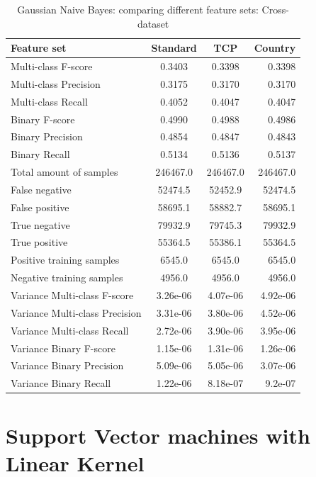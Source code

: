 \begin{table}[H]
\caption{Gaussian Naive Bayes: comparing different feature sets: Cross-dataset}
\label{tab:bay:cross}
\centering
\begin{tabular}{l c c r}
\toprule
Feature set & Standard & TCP & Country \\
\midrule
Multi-class F-score & 0.3403 & 0.3398 & 0.3398 \\
Multi-class Precision & 0.3175 & 0.3170 & 0.3170 \\
Multi-class Recall & 0.4052 & 0.4047 & 0.4047 \\
\midrule
Binary F-score & 0.4990 & 0.4988 & 0.4986 \\
Binary Precision & 0.4854 & 0.4847 & 0.4843 \\
Binary Recall & 0.5134 & 0.5136 & 0.5137 \\
\midrule
Total amount of samples & 246467.0 & 246467.0 & 246467.0 \\
False negative & 52474.5  &  52452.9 & 52474.5 \\
False positive & 58695.1 & 58882.7 & 58695.1 \\
True negative & 79932.9 & 79745.3 & 79932.9  \\
True positive & 55364.5 & 55386.1 & 55364.5 \\
\midrule
Positive training samples & 6545.0 & 6545.0 & 6545.0\\
Negative training samples & 4956.0 & 4956.0 & 4956.0\\
\midrule
Variance Multi-class F-score & 3.26e-06 & 4.07e-06 & 4.92e-06\\
Variance Multi-class Precision & 3.31e-06 &  3.80e-06 & 4.52e-06 \\
Variance Multi-class Recall &  2.72e-06 & 3.90e-06 &  3.95e-06   \\
\midrule
Variance Binary F-score & 1.15e-06 & 1.31e-06 & 1.26e-06 \\
Variance Binary Precision & 5.09e-06 &  5.05e-06  & 3.07e-06   \\
Variance Binary Recall & 1.22e-06 &  8.18e-07 & 9.2e-07 \\
\bottomrule
\end{tabular}
\end{table}

\newpage
\section{Support Vector machines with Linear Kernel}

